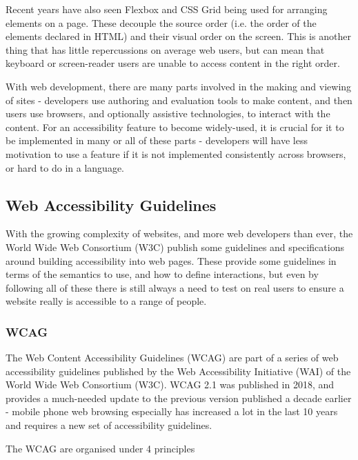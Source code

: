 \documentclass[ %
                    author={Aleena Baig},
                supervisor={Dr Simon Lock},
                    degree={BSc},
                     title={On Making Web Accessible Graphs},
                  subtitle={},
                      year={2019} ]{dissertation}
\begin{document}
Recent years have also seen Flexbox and CSS Grid being used for arranging elements on a page. These decouple the source order (i.e. the order of the elements declared in HTML) and their visual order on the screen. This is another thing that has little repercussions on average web users, but can mean that keyboard or screen-reader users are unable to access content in the right order.


With web development, there are many parts involved in the making and viewing of sites \cite{w3components} - developers use authoring and evaluation tools to make content, and then users use browsers, and optionally assistive technologies, to interact with the content. For an accessibility feature to become widely-used, it is crucial for it to be implemented in many or all of these parts - developers will have less motivation to use a feature if it is not implemented consistently across browsers, or hard to do in a language.


\subsection{Web Accessibility Guidelines}
With the growing complexity of websites, and more web developers than ever, the World Wide Web Consortium (W3C) publish some guidelines and specifications around building accessibility into web pages.
These provide some guidelines in terms of the semantics to use, and how to define interactions, but even by following all of these there is still always a need to test on real users to ensure a website really is accessible to a range of people.

\subsubsection{WCAG}

The Web Content Accessibility Guidelines (WCAG) \cite{WCAG} are part of a series of web accessibility guidelines published by the Web Accessibility Initiative (WAI) of the World Wide Web Consortium (W3C). WCAG 2.1 was published in 2018, and provides a much-needed update to the previous version published a decade earlier - mobile phone web browsing especially has increased a lot in the last 10 years and requires a new set of accessibility guidelines.

The WCAG are organised under 4 principles
\end{document}
